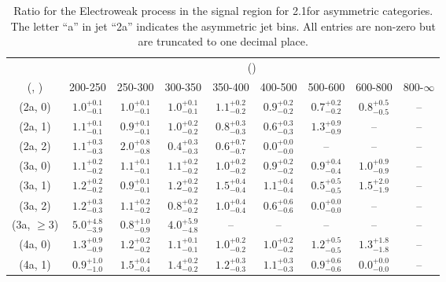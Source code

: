\begin{table}[h!]
\tiny
\centering
\caption{Ratio for the Electroweak process in the signal region for 2.1\ifb for asymmetric categories. The letter ``a'' in jet \eg ``2a''  indicates the asymmetric jet bins. All entries are non-zero but are truncated to one decimal place.\label{tab:ratiosepnaive_sig_ewk_asym}}
\begin{tabular}
{ccccccccc}
	\hline\hline
	& \multicolumn{8}{c}{\scalht (\gev)} \\ 
	 (\njet,  \nb) & 200-250 & 250-300 & 300-350 & 350-400 & 400-500 & 500-600 & 600-800 & 800-$\infty$ \\ [0.8ex] 
\hline
	(2a, 0) & $1.0^{+ 0.1 }_{- 0.1 }$ & $1.0^{+ 0.1 }_{- 0.1 }$ & $1.0^{+ 0.1 }_{- 0.1 }$ & $1.1^{+ 0.2 }_{- 0.2 }$ & $0.9^{+ 0.2 }_{- 0.2 }$ & $0.7^{+ 0.2 }_{- 0.2 }$ & $0.8^{+ 0.5 }_{- 0.5 }$ & -- \\[0.5ex] 
	(2a, 1) & $1.1^{+ 0.1 }_{- 0.1 }$ & $0.9^{+ 0.1 }_{- 0.1 }$ & $1.0^{+ 0.2 }_{- 0.2 }$ & $0.8^{+ 0.3 }_{- 0.3 }$ & $0.6^{+ 0.3 }_{- 0.3 }$ & $1.3^{+ 0.9 }_{- 0.9 }$ & -- & -- \\[0.5ex] 
	(2a, 2) & $1.1^{+ 0.3 }_{- 0.3 }$ & $2.0^{+ 0.8 }_{- 0.8 }$ & $0.4^{+ 0.3 }_{- 0.3 }$ & $0.6^{+ 0.7 }_{- 0.7 }$ & $0.0^{+ 0.0 }_{- 0.0 }$ & -- & -- & -- \\[0.5ex] 
	(3a, 0) & $1.1^{+ 0.2 }_{- 0.2 }$ & $1.1^{+ 0.1 }_{- 0.1 }$ & $1.1^{+ 0.2 }_{- 0.2 }$ & $1.0^{+ 0.2 }_{- 0.2 }$ & $0.9^{+ 0.2 }_{- 0.2 }$ & $0.9^{+ 0.4 }_{- 0.4 }$ & $1.0^{+ 0.9 }_{- 0.9 }$ & -- \\[0.5ex] 
	(3a, 1) & $1.2^{+ 0.2 }_{- 0.2 }$ & $0.9^{+ 0.1 }_{- 0.1 }$ & $1.2^{+ 0.2 }_{- 0.2 }$ & $1.5^{+ 0.4 }_{- 0.4 }$ & $1.1^{+ 0.4 }_{- 0.4 }$ & $0.5^{+ 0.5 }_{- 0.5 }$ & $1.5^{+ 2.0 }_{- 1.9 }$ & -- \\[0.5ex] 
	(3a, 2) & $1.2^{+ 0.3 }_{- 0.3 }$ & $1.1^{+ 0.2 }_{- 0.2 }$ & $0.8^{+ 0.2 }_{- 0.2 }$ & $1.0^{+ 0.4 }_{- 0.4 }$ & $0.6^{+ 0.6 }_{- 0.6 }$ & $0.0^{+ 0.0 }_{- 0.0 }$ & -- & -- \\[0.5ex] 
	(3a, $\ge3$) & $5.0^{+ 4.8 }_{- 3.9 }$ & $0.8^{+ 1.0 }_{- 0.9 }$ & $4.0^{+ 5.9 }_{- 4.8 }$ & -- & -- & -- & -- & -- \\[0.5ex] 
	(4a, 0) & $1.3^{+ 0.9 }_{- 0.9 }$ & $1.2^{+ 0.2 }_{- 0.2 }$ & $1.1^{+ 0.1 }_{- 0.1 }$ & $1.0^{+ 0.2 }_{- 0.2 }$ & $1.0^{+ 0.2 }_{- 0.2 }$ & $1.2^{+ 0.5 }_{- 0.5 }$ & $1.3^{+ 1.8 }_{- 1.8 }$ & -- \\[0.5ex] 
	(4a, 1) & $0.9^{+ 1.0 }_{- 1.0 }$ & $1.5^{+ 0.4 }_{- 0.4 }$ & $1.4^{+ 0.2 }_{- 0.2 }$ & $1.2^{+ 0.3 }_{- 0.3 }$ & $1.1^{+ 0.3 }_{- 0.3 }$ & $0.9^{+ 0.6 }_{- 0.6 }$ & $0.0^{+ 0.0 }_{- 0.0 }$ & -- \\[0.5ex] 

\end{tabular}
\end{table}
